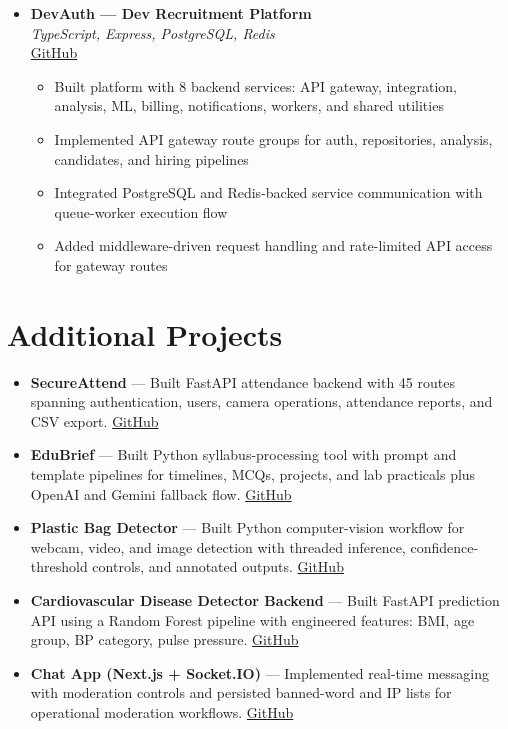 \documentclass[11pt,a4paper]{article}
\newcommand{\resumeItem}[1]{
  \item\small{#1 \vspace{-1pt}}
}
\begin{document}
\begin{itemize}[leftmargin=*]
\item \textbf{DevAuth --- Dev Recruitment Platform} \\
\textit{TypeScript, Express, PostgreSQL, Redis} \\
\href{https://github.com/Dhairya3391/devAuth}{GitHub}
\begin{itemize}[leftmargin=*]
  \resumeItem{Built platform with 8 backend services: API gateway, integration, analysis, ML, billing, notifications, workers, and shared utilities}
  \resumeItem{Implemented API gateway route groups for auth, repositories, analysis, candidates, and hiring pipelines}
  \resumeItem{Integrated PostgreSQL and Redis-backed service communication with queue-worker execution flow}
  \resumeItem{Added middleware-driven request handling and rate-limited API access for gateway routes}
\end{itemize}

\end{itemize}

\section{Additional Projects}
\begin{itemize}[leftmargin=*]
  \resumeItem{\textbf{SecureAttend} --- Built FastAPI attendance backend with 45 routes spanning authentication, users, camera operations, attendance reports, and CSV export. \href{https://github.com/Dhairya3391/SecureAttend}{GitHub}}
  \resumeItem{\textbf{EduBrief} --- Built Python syllabus-processing tool with prompt and template pipelines for timelines, MCQs, projects, and lab practicals plus OpenAI and Gemini fallback flow. \href{https://github.com/Dhairya3391/EduBrief}{GitHub}}
  \resumeItem{\textbf{Plastic Bag Detector} --- Built Python computer-vision workflow for webcam, video, and image detection with threaded inference, confidence-threshold controls, and annotated outputs. \href{https://github.com/Dhairya3391/plastic-detector}{GitHub}}
  \resumeItem{\textbf{Cardiovascular Disease Detector Backend} --- Built FastAPI prediction API using a Random Forest pipeline with engineered features: BMI, age group, BP category, pulse pressure. \href{https://github.com/Dhairya3391/Cardiovascular-Disease-Detector-Backend}{GitHub}}
  \resumeItem{\textbf{Chat App (Next.js + Socket.IO)} --- Implemented real-time messaging with moderation controls and persisted banned-word and IP lists for operational moderation workflows. \href{https://github.com/Dhairya3391/chat-app-next}{GitHub}}
\end{itemize}
\end{document}
